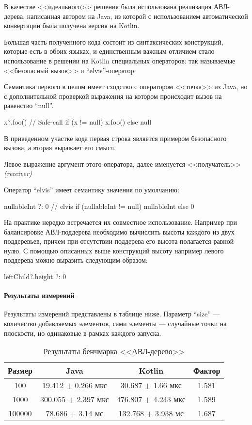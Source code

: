 В качестве <<идеального>> решения была использована реализация АВЛ-дерева, написанная автором
на Java, из которой с использованием автоматической конвертации была получена версия на Kotlin.

Большая часть полученного кода состоит из синтаксических конструкций, которые есть в обоих языках,
и единственным важным отличием стало использование в решении на Kotlin специальных операторов:
так называемые <<безопасный вызов>> и ``elvis''-оператор.

Семантика первого в целом имеет сходство с оператором <<точка>> из Java, но с дополнительной
проверкой выражения на котором происходит вызов на равенство ``null''.
\begin{pyglist}[language=kotlin]
x?.foo() // Safe-call
if (x != null) x.foo() else null
\end{pyglist}
В приведенном участке кода первая строка является примером безопасного вызова, а вторая
выражает его смысл.

Левое выражение-аргумент этого оператора, далее именуется <<получатель>> \textit{(receiver)}

Оператор ``elvis'' имеет семантику значения по умолчанию:
\begin{pyglist}[language=kotlin]
nullableInt ?: 0 // elvis
if (nullableInt != null) nullableInt else 0
\end{pyglist}

На практике нередко встречается их совместное использование.
Например при балансировке АВЛ-поддерева необходимо вычислить высоты каждого из двух поддеревьев,
причем при отсутствии поддерева его высота полагается равной нулю.
С помощью описанных выше конструкций высоту например левого поддерева можно выразить следующим
образом:
\begin{pyglist}[language=kotlin]
leftChild?.height ?: 0
\end{pyglist}

\paragraph{Результаты измерений}
Результаты измерений представлены в таблице ниже.
Параметр ``size'' --- количество добавляемых элементов, сами элементы --- случайные точки
на плоскости, но одинаковые в рамках каждого запуска.

\begin{table}[h]
\begin{center}
\begin{tabular}{|c|c|c|c|} \hline
Размер & Java & Kotlin & Фактор \\ \hline
100 & 19.412 $\pm$ 0.266 мкс & 30.687 $\pm$ 1.66 мкс & 1.581\\ \hline
1000 & 300.055 $\pm$ 2.397 мкс & 476.807 $\pm$ 4.243 мкс & 1.589\\ \hline
100000 & 78.686 $\pm$ 3.14 мс & 132.768 $\pm$ 3.938 мс & 1.687\\ \hline
\end{tabular}
\caption{Результаты бенчмарка <<АВЛ-дерево>>}
\end{center}
\end{table}

